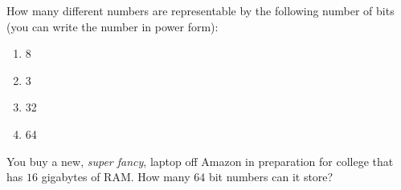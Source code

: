 \documentclass{article}
\begin{document}
\begin{Exercise}

How many different numbers are representable by the following number of bits (you can write the number in power form):

\begin{enumerate}
\item 8
\item 3
\item 32
\item 64
\end{enumerate}

\end{Exercise}

\begin{Exercise}

You buy a new, \textit{super fancy}, laptop off Amazon in preparation for college that has $16$ gigabytes of RAM.
How many $64$ bit numbers can it store?

\end{Exercise}
\end{document}
